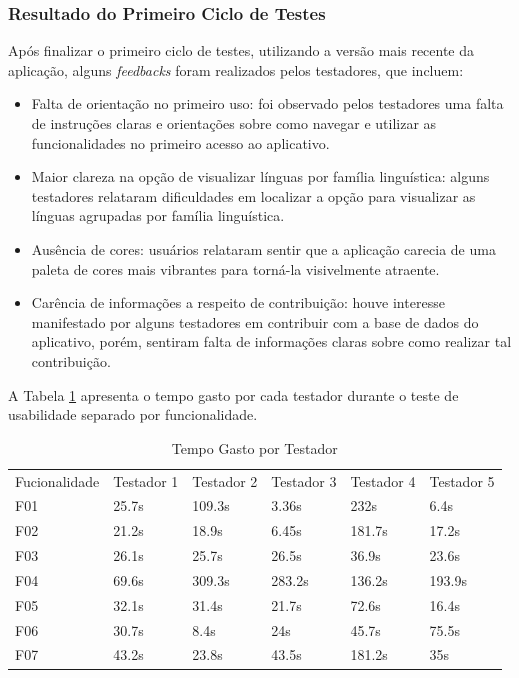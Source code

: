 \subsubsection{Resultado do Primeiro Ciclo de Testes}
\label{sec:Resultado do Primeiro Ciclo de Testes}
Após finalizar o primeiro ciclo de testes, utilizando a versão mais recente da aplicação, alguns \textit{feedbacks} foram realizados pelos testadores, que incluem:

\begin{itemize}
	\item Falta de orientação no primeiro uso: foi observado pelos testadores uma falta de instruções claras e orientações sobre como navegar e utilizar as funcionalidades no primeiro acesso ao aplicativo.
	\item Maior clareza na opção de visualizar línguas por família linguística: alguns testadores relataram dificuldades em localizar a opção para visualizar as línguas agrupadas por família linguística.
	\item Ausência de cores: usuários relataram sentir que a aplicação carecia de uma paleta de cores mais vibrantes para torná-la visivelmente atraente.
	\item Carência de informações a respeito de contribuição: houve interesse manifestado por alguns testadores em contribuir com a base de dados do aplicativo, porém, sentiram falta de informações claras sobre 
	como realizar tal contribuição. 
\end{itemize}

A Tabela \ref{tab04} apresenta o tempo gasto por cada testador durante o teste de usabilidade separado por funcionalidade.

\begin{table}[h!]
	\centering
	\caption{Tempo Gasto por Testador}
	\label{tab04}
	\begin{tabular}{l|l|l|l|l|l}
	Fucionalidade & Testador 1 & Testador 2 & Testador 3 & Testador 4 & Testador 5 \\
	F01                   & 25.7s     & 109.3s     & 3.36s      & 232s       & 6.4s      \\
	F02                   & 21.2s        & 18.9s      & 6.45s      & 181.7s    & 17.2s     \\
	F03                   & 26.1s        & 25.7s      & 26.5s      & 36.9s     & 23.6s     \\
	F04                   & 69.6s        & 309.3s     & 283.2s     & 136.2s     & 193.9s     \\
	F05                   & 32.1s      & 31.4s      & 21.7s     & 72.6s     & 16.4s     \\
	F06                   & 30.7s     & 8.4s      & 24s     & 45.7s     & 75.5s     \\
	F07                   & 43.2s     & 23.8s      & 43.5s     & 181.2s    & 35s       
	\end{tabular}
\end{table}


